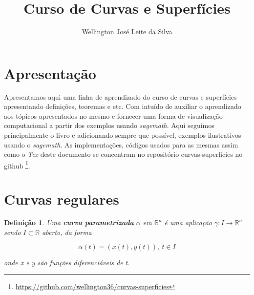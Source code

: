 \documentclass[12pt]{article}
\title{Curso de Curvas e Superfícies}
\author{Wellington José Leite da Silva\inst{1}}
\date{}
\newtheorem{definition}{Definição}
\newcommand{\furl}[1]{\footnote{\url{#1}}}
\begin{document}
\maketitle






\section*{Apresentação}\label{s1}
Apresentamos aqui uma linha de aprendizado do curso de curvas e superfícies apresentando definições, teoremas e etc. Com intuído de auxiliar o aprendizado aos tópicos apresentados no mesmo e fornecer uma forma de visualização computacional a partir dos exemplos usando \textit{sagemath}. Aqui seguimos principalmente o livro \cite{bookmain} e adicionando sempre que possível, exemplos ilustrativos usando o \textit{sagemath}. As implementações, códigos usados para as mesmas assim como o \textit{Tex} deste documento se concentram no repositório curvas-superficies no github \furl{https://github.com/wellington36/curvas-superficies}.

\section{Curvas regulares}\label{s2}

\begin{definition}
Uma \textbf{curva parametrizada} $\alpha$ em $\mathbb{R}^n$ é uma aplicação $\gamma: I \rightarrow \mathbb{R}^n$ sendo $I \subset \mathbb{R}$ aberto, da forma

$$\alpha(t) = (x(t), y(t)),\ t\in I$$

onde x e y são funções diferenciáveis de t.
\end{definition}
\end{document}
